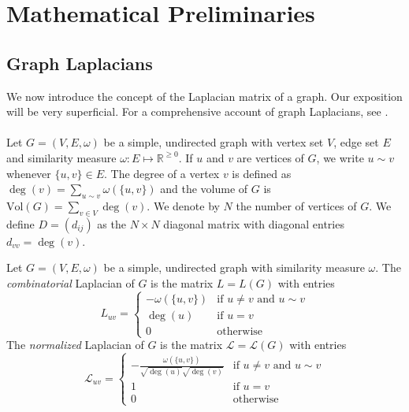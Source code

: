 \chapter{Mathematical Preliminaries}
\label{cha:math-prel}
\section{Graph Laplacians}
\label{sec:graph-laplacians}
We now introduce the concept of the Laplacian matrix of a graph. Our
exposition will be very superficial. For a comprehensive account
of graph Laplacians, see
\citep{chung05:_laplac_cheeg,cvetkovic80:_spect_graph_theor_applic}. \\
\\
%
\noindent Let $G = (V,E,\omega)$ be a simple, undirected graph with
vertex set $V$, edge set $E$ and similarity measure $\omega \colon E \mapsto
\mathbb{R}^{\geq 0}$. If $u$ and $v$ are vertices of $G$, we write $u
\sim v$ whenever $\{u,v\} \in E$. The degree of a vertex $v$ is
defined as $\deg(v) = \sum_{u \sim v}{\omega(\{u,v\})}$ and the volume
of $G$ is $\mathrm{Vol}(G) = \sum_{v \in V}{\deg(v)}$.  We denote by
$N$ the number of vertices of $G$. We define $D = (d_{ij})$ as the $N
\times N$ diagonal matrix with diagonal entries $d_{vv} = \deg(v)$.
\begin{definition}
  \label{def:1}
  Let $G = (V,E,\omega)$ be a simple, undirected graph with similarity
  measure $\omega$. The {\em combinatorial} Laplacian of $G$ is the
  matrix $L = L(G)$ with entries
  \begin{equation}
    \label{eq:1}
    L_{uv} = \begin{cases}
      - \omega(\{u,v\}) & \text{if $u \not = v$ and $u \sim v$} \\
      \deg(u) & \text{if $u = v$} \\
      0 & \text{otherwise}
    \end{cases}
  \end{equation}
  The {\em normalized} Laplacian of $G$ is the matrix $\mathcal{L} =
  \mathcal{L}(G)$ with entries
  \begin{equation}
    \label{eq:2}
    \mathcal{L}_{uv} = \begin{cases}
      - \tfrac{\omega(\{u,v\})}{\sqrt{\deg(u)}\sqrt{\deg(v)}} & \text{if $u \not = v$ and $u \sim v$} \\
      1 & \text{if $u = v$} \\
      0 & \text{otherwise}
    \end{cases}
  \end{equation}
\end{definition}
